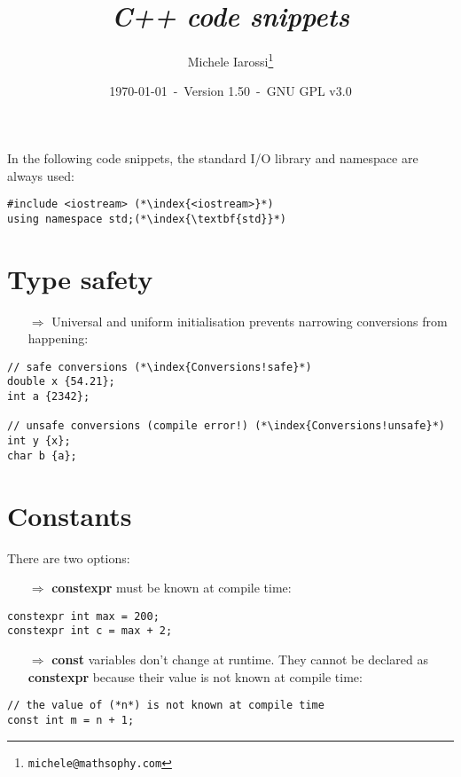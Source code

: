 \documentclass[10pt]{article}
\begin{document}
\title{\emph{C++ code snippets}}
\author{Michele Iarossi\thanks{\texttt{michele@mathsophy.com}}}
\date{\small \today~-~Version 1.50~-~GNU GPL v3.0}


\maketitle

\small

\begin{frame}{}
\setlength\columnsep{1cm}
\begin{multicols}{2}
\tableofcontents
\end{multicols}
\end{frame}

\noindent
In the following code snippets, the standard I/O library and namespace are always used:
\begin{lstlisting}
#include <iostream> (*\index{<iostream>}*)
using namespace std;(*\index{\textbf{std}}*) 
\end{lstlisting}

\newpage
%
%
\section{Type safety}
\small
\begin{enumerate}
\item[$\Rightarrow$] Universal and uniform initialisation prevents narrowing conversions from happening:
\end{enumerate}
\begin{lstlisting}
// safe conversions (*\index{Conversions!safe}*)
double x {54.21};
int a {2342};

// unsafe conversions (compile error!) (*\index{Conversions!unsafe}*)
int y {x};
char b {a};
\end{lstlisting}
%
%
\section{Constants}
\small
There are two options:
\begin{enumerate}
\item[$\Rightarrow$] \textbf{constexpr} must be known at compile time:
\end{enumerate}
\begin{lstlisting}
constexpr int max = 200;
constexpr int c = max + 2;
\end{lstlisting}
\begin{enumerate}
\item[$\Rightarrow$] \textbf{const} variables don't change at runtime. They cannot be declared as
\textbf{constexpr} because their value is not known at compile time:
\end{enumerate}
\begin{lstlisting}
// the value of (*n*) is not known at compile time
const int m = n + 1;
\end{lstlisting}
%
%
\end{document}
